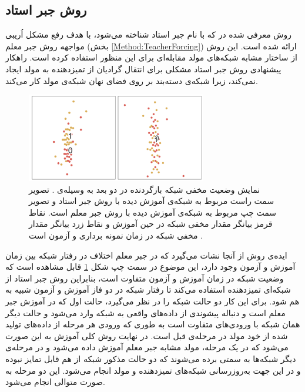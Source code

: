  \subsection{روش جبر استاد} 
 روش معرفی شده در 
 \cite{lamb2016professor}
 که با نام جبر استاد شناخته می‌شود، با هدف رفع مشکل اُریبی مواجهه روش  جبر معلم 
(بخش
 \ref{Method:TeacherForcing})
 ارائه شده است. این روش از ساختار مشابه شبکه‌های مولد مقابله‌ای برای این منظور استفاده کرده است. راهکار پیشنهادی روش جبر استاد مشکلی برای انتقال گرادیان از تمیزدهنده به مولد ایجاد نمی‌کند، زیرا شبکه‌ی دسته‌بند بر روی فضای نهان شبکه‌ی مولد کار می‌کند.
\begin{figure}[!htb]
	\centering
	\includegraphics[width=0.7\textwidth]{images/ProfessorForcingHiddenVisulization.png} 
	\caption[نمایش  وضعیت مخفی  شبکه بازگردنده در دو بعد به وسیله‌ی
	.]{
		نمایش  وضعیت مخفی  شبکه بازگردنده در دو بعد به وسیله‌ی
		.
		تصویر سمت راست مربوط به شبکه‌ی آموزش دیده با روش جبر استاد و تصویر سمت چپ مربوط به شبکه‌ی آموزش دیده با روش جبر معلم است. نقاط قرمز بیانگر مقدار مخفی شبکه در حین آموزش و نقاط زرد بیانگر مقدار مخفی شبکه در زمان نمونه برداری و آزمون است
		\cite{lamb2016professor}.
	}
	\label{Figure:ProfessorForcing:EmbeddingVisualization}
\end{figure}
\newline
ایده‌ی روش از آنجا نشات می‌گیرد که در جبر معلم اختلاف در رفتار شبکه بین زمان آموزش و آزمون وجود دارد، این موضوع در سمت چپ شکل
 \ref{Figure:ProfessorForcing:EmbeddingVisualization}
قابل مشاهده است که وضعیت شبکه در زمان آموزش و آزمون متفاوت است، بنابراین روش جبر استاد از شبکه‌ای تمیزدهنده استفاده می‌کند تا رفتار شبکه در دو فاز آموزش و آزمون شبیه به هم شود. برای این کار دو حالت شبکه را در نظر می‌گیرد، حالت اول که در آموزش جبر معلم است و دنباله پیشوندی از داده‌های واقعی به شبکه وارد می‌شود و حالت دیگر همان شبکه با ورودی‌های متفاوت است به طوری که ورودی هر مرحله از داده‌های تولید شده از خود مولد در مرحله‌ی قبل است.
 در نهایت روش کلی آموزش به این صورت می‌شود که در یک مرحله، مولد مشابه جبر معلم آموزش داده می‌شود و در مرحله‌ی دیگر شبکه‌ها به سمتی برده می‌شوند که دو حالت مذکور شبکه از هم قابل تمایز نبوده و در این جهت به‌روزرسانی شبکه‌های تمیزدهنده و مولد انجام می‌شود. این دو مرحله به صورت متوالی انجام می‌شود.
